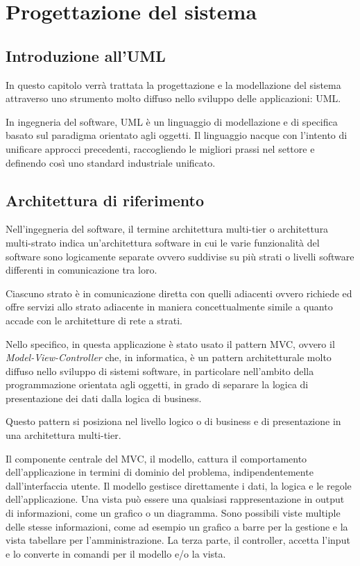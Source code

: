\chapter{Progettazione del sistema}

	\section{Introduzione all'UML}
	In questo capitolo verrà trattata la progettazione e la modellazione del sistema attraverso uno strumento molto diffuso nello sviluppo delle applicazioni: UML. 
	
	
	In ingegneria del software, UML è un linguaggio di modellazione e di specifica basato sul paradigma orientato agli oggetti. Il linguaggio nacque con l'intento di unificare approcci precedenti, raccogliendo le migliori prassi nel settore e definendo così uno standard industriale unificato.
	
	\section{Architettura di riferimento}
	
	Nell'ingegneria del software, il termine architettura multi-tier o architettura multi-strato indica un'architettura software in cui le varie funzionalità del software sono logicamente separate ovvero suddivise su più strati o livelli software differenti in comunicazione tra loro.
	
	Ciascuno strato è in comunicazione diretta con quelli adiacenti ovvero richiede ed offre servizi allo strato adiacente in maniera concettualmente simile a quanto accade con le architetture di rete a strati.
	
	Nello specifico, in questa applicazione è stato usato il pattern MVC, ovvero il \textit{Model-View-Controller} che, in informatica, è un pattern architetturale molto diffuso nello sviluppo di sistemi software, in particolare nell'ambito della programmazione orientata agli oggetti, in grado di separare la logica di presentazione dei dati dalla logica di business.
	
	Questo pattern si posiziona nel livello logico o di business e di presentazione in una architettura multi-tier.
	
	Il componente centrale del MVC, il modello, cattura il comportamento dell'applicazione in termini di dominio del problema, indipendentemente dall'interfaccia utente. Il modello gestisce direttamente i dati, la logica e le regole dell'applicazione. Una vista può essere una qualsiasi rappresentazione in output di informazioni, come un grafico o un diagramma. Sono possibili viste multiple delle stesse informazioni, come ad esempio un grafico a barre per la gestione e la vista tabellare per l'amministrazione. La terza parte, il controller, accetta l'input e lo converte in comandi per il modello e/o la vista.
	
